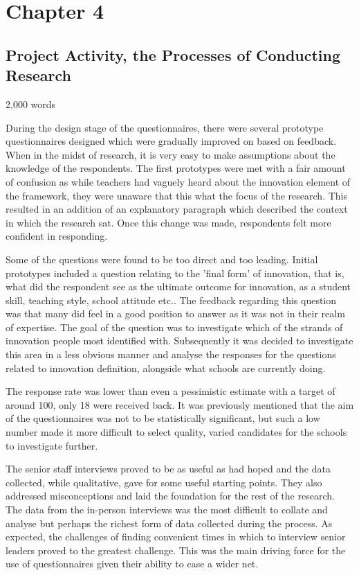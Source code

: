 \section{Chapter 4}
\subsection{Project Activity, the Processes of Conducting Research}
2,000 words 

During the design stage of the questionnaires, there were several prototype questionnaires designed which were gradually improved on based on feedback. When in the midst of research, it is very easy to make assumptions about the knowledge of the respondents. The first prototypes were met with a fair amount of confusion as while teachers had vaguely heard about the innovation element of the framework, they were unaware that this what the focus of the research. This resulted in an addition of an explanatory paragraph which described the context in which the research sat. Once this change was made, respondents felt more confident in responding.

Some of the questions were found to be too direct and too leading. Initial prototypes included a question relating to the 'final form' of innovation, that is, what did the respondent see as the ultimate outcome for innovation, as a student skill, teaching style, school attitude etc.. The feedback regarding this question was that many did feel in a good position to answer as it was not in their realm of expertise. The goal of the question was to investigate which of the strands of innovation people most identified with. Subsequently it was decided to investigate this area in a less obvious manner and analyse the responses for the questions related to innovation definition, alongside what schools are currently doing.

The response rate was lower than even a pessimistic estimate with a target of around 100, only 18 were received back. It was previously mentioned that the aim of the questionnaires was not to be statistically significant, but such a low number made it more difficult to select quality, varied candidates for the schools to investigate further.

The senior staff interviews proved to be as useful as had hoped and the data collected, while qualitative, gave for some useful starting points. They also addressed misconceptions and laid the foundation for the rest of the research. The data from the in-person interviews was the most difficult to collate and analyse but perhaps the richest form of data collected during the process. As expected, the challenges of finding convenient times in which to interview senior leaders proved to the greatest challenge. This was the main driving force for the use of questionnaires given their ability to case a wider net. 

